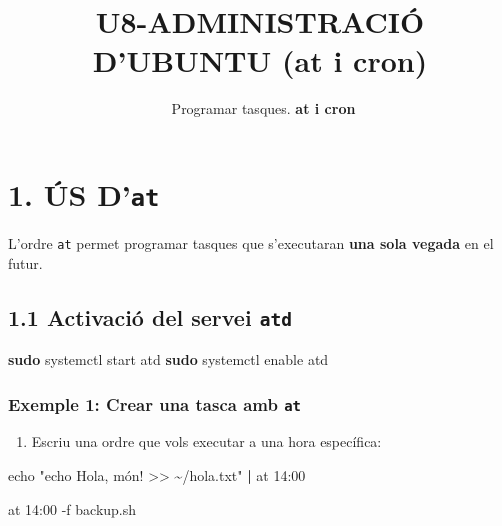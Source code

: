 \documentclass[
  12 pt,
  a4paper,
]{article}
\title{U8-ADMINISTRACIÓ D'UBUNTU (at i cron)}
\subtitle{~Programar tasques. \textbf{at i cron}}
\author{}
\date{\vspace{-2.5em}}
\newenvironment{Shaded}{\begin{snugshade}}{\end{snugshade}}
\newcommand{\AttributeTok}[1]{\textcolor[rgb]{0.13,0.29,0.53}{#1}}
\newcommand{\BuiltInTok}[1]{#1}
\newcommand{\ExtensionTok}[1]{#1}
\newcommand{\FunctionTok}[1]{\textcolor[rgb]{0.13,0.29,0.53}{\textbf{#1}}}
\newcommand{\KeywordTok}[1]{\textcolor[rgb]{0.13,0.29,0.53}{\textbf{#1}}}
\newcommand{\NormalTok}[1]{#1}
\newcommand{\StringTok}[1]{\textcolor[rgb]{0.31,0.60,0.02}{#1}}
\providecommand{\tightlist}{%
  \setlength{\itemsep}{0pt}\setlength{\parskip}{0pt}}
\begin{document}
\maketitle

\section{\texorpdfstring{1. ÚS
D'\texttt{at}}{1. ÚS D'at}}\label{uxfas-dat}

L'ordre \texttt{at} permet programar tasques que s'executaran
\textbf{una sola vegada} en el futur.

\subsection{\texorpdfstring{1.1 Activació del servei
\texttt{atd}}{1.1 Activació del servei atd}}\label{activaciuxf3-del-servei-atd}

\begin{Shaded}
\begin{Highlighting}[]
\FunctionTok{sudo}\NormalTok{ systemctl start atd}
\FunctionTok{sudo}\NormalTok{ systemctl enable atd}
\end{Highlighting}
\end{Shaded}

\subsubsection{\texorpdfstring{Exemple 1: Crear una tasca amb
\texttt{at}}{Exemple 1: Crear una tasca amb at}}\label{exemple-1-crear-una-tasca-amb-at}

\begin{enumerate}
\def\labelenumi{\arabic{enumi}.}
\tightlist
\item
  Escriu una ordre que vols executar a una hora específica:
\end{enumerate}

\begin{Shaded}
\begin{Highlighting}[]
\BuiltInTok{echo} \StringTok{"echo \textquotesingle{}Hola, món!\textquotesingle{} \textgreater{}\textgreater{} \textasciitilde{}/hola.txt"} \KeywordTok{|} \ExtensionTok{at}\NormalTok{ 14:00}
\end{Highlighting}
\end{Shaded}

\begin{Shaded}
\begin{Highlighting}[]
\ExtensionTok{at}\NormalTok{ 14:00 }\AttributeTok{{-}f}\NormalTok{ backup.sh}
\end{Highlighting}
\end{Shaded}
\end{document}
